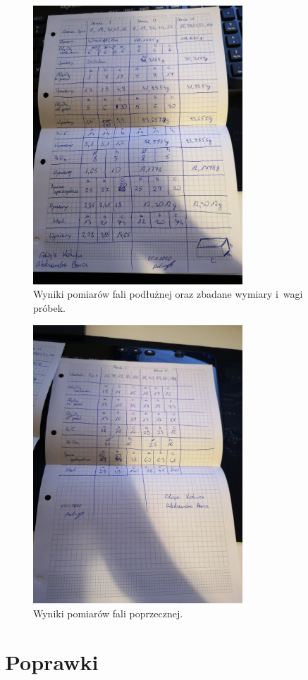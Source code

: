 \documentclass[a4paper,12pt]{article}
\begin{document}
\begin{figure}[H]
    \centering
    \includegraphics[width=0.7\textwidth]{img/fala_podluzna.jpg}
    \caption{Wyniki pomiarów fali podłużnej oraz zbadane wymiary i~wagi próbek.}
\end{figure}

\begin{figure}[H]
    \centering
    \includegraphics[width=0.7\textwidth]{img/fala_poprzeczna.jpg}
    \caption{Wyniki pomiarów fali poprzecznej.}
\end{figure}
\newpage

\section{Poprawki}



\end{document}
